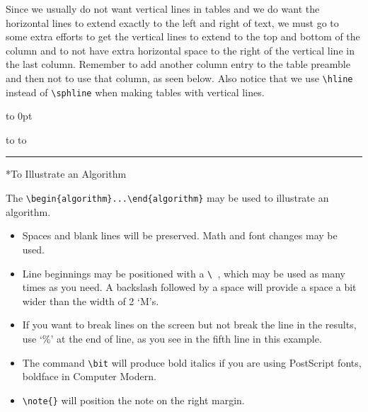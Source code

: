 \documentclass{kapproc} %
\makeatletter
\newif\ifdotoc
\def\numberline#1{}
\def\ysection#1{\ifdotoc
\addcontentsline{toc}{section}{\protect\numberline{x}#1}\fi
{\let\uppercase\relax
\@startsection {section}{3}{-24pt}{-36pt plus -1pt minus 
 -1pt}{1sp}{\Large\bf}*{#1}}}
\def\section{\ysection}
\def\code{\vskip3pt
\hbox to\textwidth{\vrule width \textwidth height .6pt}
\normalsize\vskip1sp}
\def\endcode{\vskip6pt}
\makeatother
\begin{document}
Since we usually do not want vertical
lines in tables and we do want the horizontal lines to extend
exactly to the left and right of text, 
we must go to some extra efforts to get the vertical lines
to extend to the top and bottom of the column and to not
have extra horizontal space to the right of the vertical line
in the last column.
Remember to
add another column entry to the table preamble
and then not to use that column, as seen below. Also notice
that we use \verb+\hline+ instead of \verb+\sphline+
when making tables with vertical lines.

\vtop to 0pt{
\code
\hbox to
\endcode
\hrule
\vss}
\newpage


\section{To Illustrate an Algorithm}

The \verb+\begin{algorithm}...\end{algorithm}+ may be used
to illustrate an algorithm.

\begin{itemize}
\item
Spaces and
blank lines will be preserved.
Math and font changes may be used. 

\item
Line beginnings may be
positioned with a \verb+\ +, which may be used as many
times as you need. A backslash followed by a space
will provide a space a bit wider than the width of 2 `M's.

\item
If you want to break lines on the screen but not break the line
in the results, use `\%' at the end of line, as you see in
the fifth line in this example.

\item
The command
\verb+\bit+ will produce bold italics if you are using PostScript fonts, 
boldface in Computer Modern. 

\item
\verb+\note{}+ will position the note on the right margin. 
\end{itemize}
\end{document}
